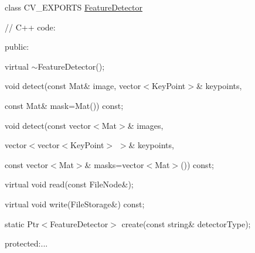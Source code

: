 class C\+V\+\_\+\+E\+X\+P\+O\+R\+TS \mbox{\hyperlink{classorg_1_1opencv_1_1features2d_1_1_feature_detector}{Feature\+Detector}} {\ttfamily }

{\ttfamily }

{\ttfamily }

{\ttfamily // C++ code\+:}

{\ttfamily }

{\ttfamily }

{\ttfamily public\+:}

{\ttfamily }

{\ttfamily }

{\ttfamily virtual $\sim$\+Feature\+Detector();}

{\ttfamily }

{\ttfamily }

{\ttfamily void detect(const Mat\& image, vector$<$\+Key\+Point$>$\& keypoints,}

{\ttfamily }

{\ttfamily }

{\ttfamily const Mat\& mask=Mat()) const;}

{\ttfamily }

{\ttfamily }

{\ttfamily void detect(const vector$<$\+Mat$>$\& images,}

{\ttfamily }

{\ttfamily }

{\ttfamily vector$<$vector$<$\+Key\+Point$>$ $>$\& keypoints,}

{\ttfamily }

{\ttfamily }

{\ttfamily const vector$<$\+Mat$>$\& masks=vector$<$\+Mat$>$()) const;}

{\ttfamily }

{\ttfamily }

{\ttfamily virtual void read(const File\+Node\&);}

{\ttfamily }

{\ttfamily }

{\ttfamily virtual void write(\+File\+Storage\&) const;}

{\ttfamily }

{\ttfamily }

{\ttfamily static Ptr$<$\+Feature\+Detector$>$ create(const string\& detector\+Type);}

{\ttfamily }

{\ttfamily }

{\ttfamily protected\+:...}

